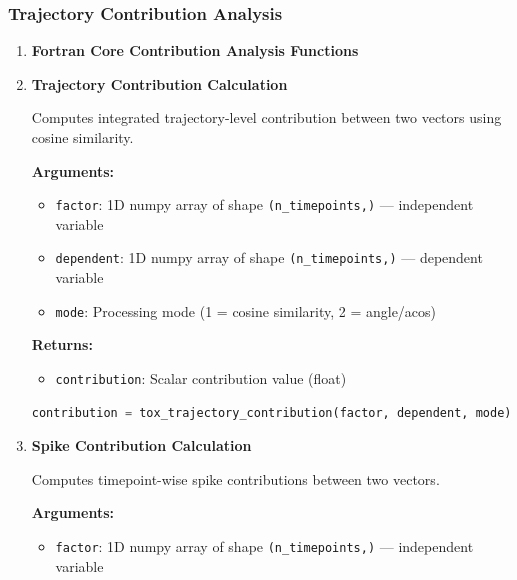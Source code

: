 \subsubsection{Trajectory Contribution Analysis}
\begin{enumerate}
    \item \textbf{Fortran Core Contribution Analysis Functions}
          
    \item \textbf{Trajectory Contribution Calculation}
          
          Computes integrated trajectory-level contribution between two vectors using
          cosine similarity.
          
          \textbf{Arguments:}
          \begin{itemize}
            \item \texttt{factor}: 1D numpy array of shape \texttt{(n\_timepoints,)}
                  — independent variable
                  
            \item \texttt{dependent}: 1D numpy array of shape \texttt{(n\_timepoints,)}
                  — dependent variable
                  
            \item \texttt{mode}: Processing mode (1 = cosine similarity, 2 = angle/acos)
          \end{itemize}
          \textbf{Returns:}
          \begin{itemize}
            \item \texttt{contribution}: Scalar contribution value (float)
          \end{itemize}
          \begin{lstlisting}[language=Python, caption={Trajectory-Level Contribution Calculation}]
contribution = tox_trajectory_contribution(factor, dependent, mode)
          \end{lstlisting}
          
    \item \textbf{Spike Contribution Calculation}
          
          Computes timepoint-wise spike contributions between two vectors.
          
          \textbf{Arguments:}
          \begin{itemize}
            \item \texttt{factor}: 1D numpy array of shape \texttt{(n\_timepoints,)}
                  — independent variable
                  

\end{itemize}
\end{enumerate}
